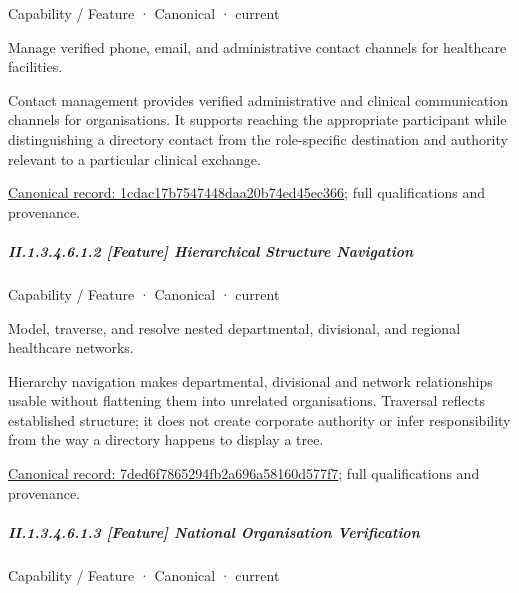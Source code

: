 \label{element:1cdac17b7547448daa20b74ed45ec366}
{\small Capability / Feature · Canonical · current}\par

Manage verified phone, email, and administrative contact channels for healthcare facilities.



Contact management provides verified administrative and clinical communication channels for organisations. It supports reaching the appropriate participant while distinguishing a directory contact from the role-specific destination and authority relevant to a particular clinical exchange.


{\footnotesize \href{../../../../../../../continuum/strategy/capability/feature/1cdac17b7547448daa20b74ed45ec366.md}{Canonical record: 1cdac17b7547448daa20b74ed45ec366}; full qualifications and provenance.}\par
\subparagraph*{II.1.3.4.6.1.2 [Feature] Hierarchical Structure Navigation}
\label{navigation:II.1.3.4.6.1.2}

\label{element:7ded6f7865294fb2a696a58160d577f7}
{\small Capability / Feature · Canonical · current}\par

Model, traverse, and resolve nested departmental, divisional, and regional healthcare networks.



Hierarchy navigation makes departmental, divisional and network relationships usable without flattening them into unrelated organisations. Traversal reflects established structure; it does not create corporate authority or infer responsibility from the way a directory happens to display a tree.


{\footnotesize \href{../../../../../../../continuum/strategy/capability/feature/7ded6f7865294fb2a696a58160d577f7.md}{Canonical record: 7ded6f7865294fb2a696a58160d577f7}; full qualifications and provenance.}\par
\subparagraph*{II.1.3.4.6.1.3 [Feature] National Organisation Verification}
\label{navigation:II.1.3.4.6.1.3}

\label{element:0f17fe5439fe45dc8f4edbff3cca0776}
{\small Capability / Feature · Canonical · current}\par


